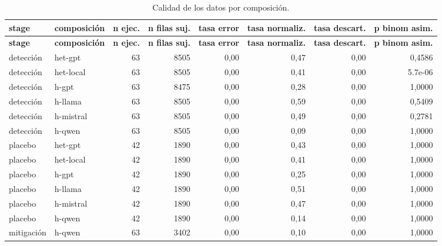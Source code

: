 \begin{landscape}
\scriptsize
\begin{longtable}{llrrrrrr}
\caption{Calidad de los datos por composición.}\label{tab:t01}\\
\hline
\textbf{stage} & \textbf{composición} & \textbf{n ejec.} & \textbf{n filas suj.} & \textbf{tasa error} & \textbf{tasa normaliz.} & \textbf{tasa descart.} & \textbf{p binom asim.} \\
\hline
\endfirsthead
\hline
\textbf{stage} & \textbf{composición} & \textbf{n ejec.} & \textbf{n filas suj.} & \textbf{tasa error} & \textbf{tasa normaliz.} & \textbf{tasa descart.} & \textbf{p binom asim.} \\
\hline
\endhead
\hline
\endfoot
detección & het-gpt & 63 & 8505 & 0,00 & 0,47 & 0,00 & 0,4586 \\
detección & het-local & 63 & 8505 & 0,00 & 0,41 & 0,00 & 5.7e-06 \\
detección & h-gpt & 63 & 8475 & 0,00 & 0,28 & 0,00 & 1,0000 \\
detección & h-llama & 63 & 8505 & 0,00 & 0,59 & 0,00 & 0,5409 \\
detección & h-mistral & 63 & 8505 & 0,00 & 0,49 & 0,00 & 0,2781 \\
detección & h-qwen & 63 & 8505 & 0,00 & 0,09 & 0,00 & 1,0000 \\
placebo & het-gpt & 42 & 1890 & 0,00 & 0,43 & 0,00 & 1,0000 \\
placebo & het-local & 42 & 1890 & 0,00 & 0,41 & 0,00 & 1,0000 \\
placebo & h-gpt & 42 & 1890 & 0,00 & 0,25 & 0,00 & 1,0000 \\
placebo & h-llama & 42 & 1890 & 0,00 & 0,51 & 0,00 & 1,0000 \\
placebo & h-mistral & 42 & 1890 & 0,00 & 0,47 & 0,00 & 1,0000 \\
placebo & h-qwen & 42 & 1890 & 0,00 & 0,14 & 0,00 & 1,0000 \\
mitigación & h-qwen & 63 & 3402 & 0,00 & 0,10 & 0,00 & 1,0000 \\
\end{longtable}
\end{landscape}
